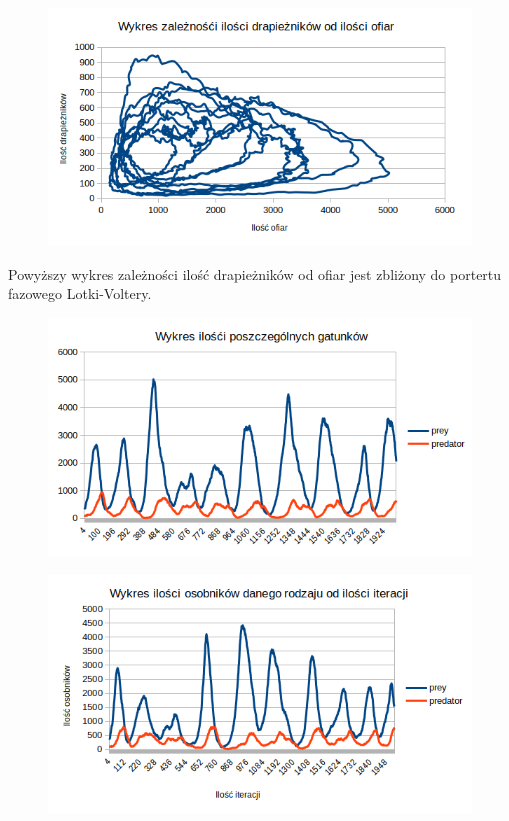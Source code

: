 \begin{figure}[!htb]
	\centering
	\includegraphics[width=1.1\linewidth]{img/ok11}
	\caption{\label{fig:screen} }
\end{figure}
Powyższy wykres zależności ilość drapieżników od ofiar jest zbliżony do portertu fazowego Lotki-Voltery.
\begin{figure}[!htb]
	\centering
	\includegraphics[width=1.1\linewidth]{img/ok1}
	\caption{\label{fig:screen} }
\end{figure}

\begin{figure}[!htb]
	\centering
	\includegraphics[width=1.1\linewidth]{img/ok2}
	\caption{\label{fig:screen} }
\end{figure}



